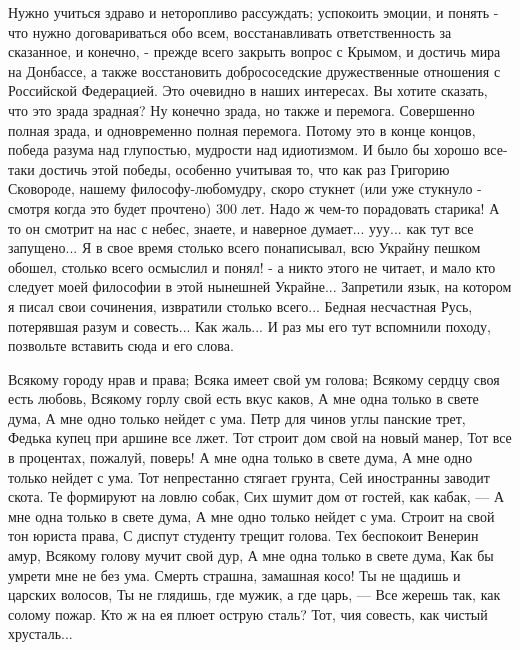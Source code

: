 Нужно учиться здраво и неторопливо рассуждать; успокоить эмоции, и понять - что
нужно договариваться обо всем, восстанавливать ответственность за сказанное, и
конечно, - прежде всего закрыть вопрос с Крымом, и достичь мира на Донбассе, а
также восстановить добрососедские дружественные отношения с Российской
Федерацией. Это очевидно в наших интересах. Вы хотите сказать, что это зрада
зрадная? Ну конечно зрада, но также и перемога. Совершенно полная зрада, и
одновременно полная перемога.  Потому это в конце концов, победа разума над
глупостью, мудрости над идиотизмом. И было бы хорошо все-таки достичь этой
победы, особенно учитывая то, что как раз Григорию Сковороде, нашему
философу-любомудру, скоро стукнет (или уже стукнуло - смотря когда это будет
прочтено) 300 лет. Надо ж чем-то порадовать старика! А то он смотрит на нас с
небес, знаете, и наверное думает...  ууу...  как тут все запущено... Я в свое
время столько всего понаписывал, всю Украйну пешком обошел, столько всего
осмыслил и понял! - а никто этого не читает, и мало кто следует моей философии
в этой нынешней Украйне... Запретили язык, на котором я писал свои сочинения,
извратили столько всего... Бедная несчастная Русь, потерявшая разум и
совесть... Как жаль... И раз мы его тут вспомнили походу, позвольте вставить
сюда и его слова.

\raggedcolumns
\begin{multicols}{2} %
\setlength{\parindent}{0pt}
\obeycr
Всякому городу нрав и права;
Всяка имеет свой ум голова;
Всякому сердцу своя есть любовь,
Всякому горлу свой есть вкус каков,
\smallskip
А мне одна только в свете дума,
А мне одно только нейдет с ума.
Петр для чинов углы панские трет,
Федька купец при аршине все лжет.
\smallskip
Тот строит дом свой на новый манер,
Тот все в процентах, пожалуй, поверь!
А мне одна только в свете дума,
А мне одно только нейдет с ума.
\smallskip
Тот непрестанно стягает грунта,
Сей иностранны заводит скота.
Те формируют на ловлю собак,
Сих шумит дом от гостей, как кабак, —
\smallskip
А мне одна только в свете дума,
А мне одно только нейдет с ума.
Строит на свой тон юриста права,
С диспут студенту трещит голова.
\smallskip
Тех беспокоит Венерин амур,
Всякому голову мучит свой дур,
А мне одна только в свете дума,
Как бы умрети мне не без ума.
\smallskip
Смерть страшна, замашная косо!
Ты не щадишь и царских волосов,
Ты не глядишь, где мужик, а где царь, —
Все жерешь так, как солому пожар.
\smallskip
Кто ж на ея плюет острую сталь?
Тот, чия совесть, как чистый хрусталь...
\restorecr
\end{multicols} %

